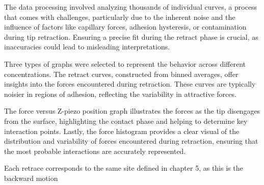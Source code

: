 The data processing involved analyzing thousands of individual curves, a process that comes with challenges, particularly due to the inherent noise and the influence of factors like capillary forces, adhesion hysteresis, or contamination during tip retraction. Ensuring a precise fit during the retract phase is crucial, as inaccuracies could lead to misleading interpretations.

Three types of graphs were selected to represent the behavior across different concentrations. The retract curves, constructed from binned averages, offer insights into the forces encountered during retraction. These curves are typically noisier in regions of adhesion, reflecting the variability in attractive forces.

The force versus Z-piezo position graph illustrates the forces as the tip disengages from the surface, highlighting the contact phase and helping to determine key interaction points. Lastly, the force histogram provides a clear visual of the distribution and variability of forces encountered during retraction, ensuring that the most probable interactions are accurately represented.

Each retrace corresponds to the same site defined in chapter 5, as this is the backward motion 


